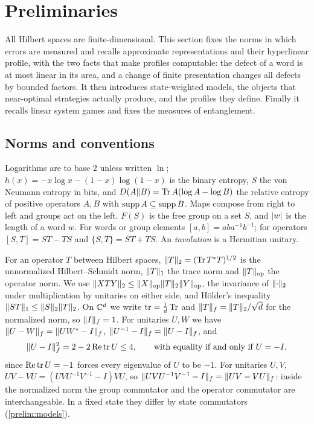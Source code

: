 \section{Preliminaries}\label{sec:prelim}

All Hilbert spaces are finite-dimensional. This section fixes the norms in which errors are measured and recalls approximate
representations and their hyperlinear profile, with the two facts that make profiles computable: the defect of a word is at most
linear in its area, and a change of finite presentation changes all defects by bounded factors. It then introduces state-weighted
models, the objects that near-optimal strategies actually produce, and the profiles they define. Finally it recalls linear system
games and fixes the measures of entanglement.

\subsection{Norms and conventions}

Logarithms are to base $2$ unless written $\ln$; $h(x)=-x\log x-(1-x)\log(1-x)$ is the binary entropy, $S$ the von Neumann entropy in
bits, and $D(A\|B)=\operatorname{Tr} A(\log A-\log B)$ the relative entropy of positive operators $A,B$ with $\operatorname{supp} A\subseteq\operatorname{supp} B$. Maps compose
from right to left and groups act on the left. $F(S)$ is the free group on a set $S$, and $\lvert w\rvert$ is the length of a word $w$. For
words or group elements $[a,b]=aba^{-1}b^{-1}$; for operators $[S,T]=ST-TS$ and $\{S,T\}=ST+TS$. An \emph{involution} is a Hermitian
unitary.

For an operator $T$ between Hilbert spaces, $\lVert T\rVert_2=(\operatorname{Tr} T^*T)^{1/2}$ is the unnormalized Hilbert--Schmidt norm, $\lVert T\rVert_1$ the trace norm
and $\lVert T\rVert_{\mathrm{op}}$ the operator norm. We use $\lVert XTY\rVert_2\le\lVert X\rVert_{\mathrm{op}}\lVert T\rVert_2\lVert Y\rVert_{\mathrm{op}}$, the invariance of $\lVert \cdot\rVert_2$ under multiplication by unitaries
on either side, and H\"older's inequality $\lVert ST\rVert_1\le\lVert S\rVert_2\lVert T\rVert_2$. On $\mathbb C^d$ we write $\operatorname{tr}=\frac1d\operatorname{Tr}$ and $\lVert T\rVert_f=\lVert T\rVert_2/\sqrt d$ for the
normalized norm, so $\lVert I\rVert_f=1$. For unitaries $U,W$ we have $\lVert U-W\rVert_f=\lVert UW^*-I\rVert_f$, $\lVert U^{-1}-I\rVert_f=\lVert U-I\rVert_f$, and
\begin{equation}\label{eq:unitary-distance}
\lVert U-I\rVert_f^2=2-2\operatorname{Re}\operatorname{tr} U\le4,\qquad\text{with equality if and only if }U=-I ,
\end{equation}
since $\operatorname{Re}\operatorname{tr} U=-1$ forces every eigenvalue of $U$ to be $-1$. For unitaries $U,V$, $UV-VU=(UVU^{-1}V^{-1}-I)VU$, so
$\lVert UVU^{-1}V^{-1}-I\rVert_f=\lVert UV-VU\rVert_f$: inside the normalized norm the group commutator and the operator commutator are interchangeable.
In a fixed state they differ by state commutators (\cref{prelim:models}).

